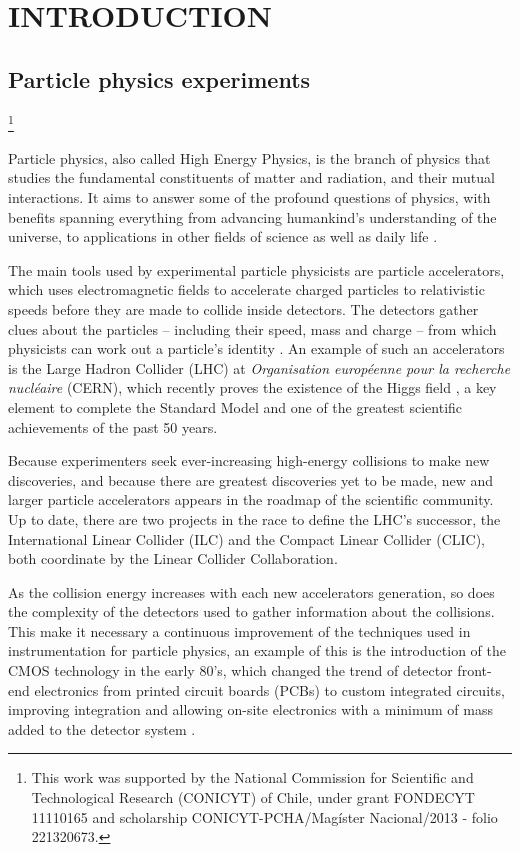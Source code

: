 \newcommand\blfootnote[1]{%
  \begingroup
  \renewcommand\thefootnote{}\footnote{#1}%
  \addtocounter{footnote}{-1}%
  \endgroup
}

\chapter{INTRODUCTION}
\label{chapter:introduction}
\section{Particle physics experiments}
\blfootnote{This work was supported by the National Commission for Scientific and Technological Research (CONICYT) of Chile, under grant FONDECYT 11110165 and scholarship CONICYT-PCHA/Mag\'ister Nacional/2013 - folio 221320673.} Particle physics, also called High Energy Physics, is the branch of physics that studies the fundamental constituents of matter and radiation, and their mutual interactions. It aims to answer some of the profound questions of physics, with benefits spanning everything from advancing humankind’s understanding of the universe, to applications in other fields of science as well as daily life \citep{tuttle101}.

The main tools used by experimental particle physicists are particle accelerators, which uses electromagnetic fields to accelerate charged particles to relativistic speeds before they are made to collide inside detectors. The detectors gather clues about the particles – including their speed, mass and charge – from which physicists can work out a particle's identity \citep{cern101}. An example of such an accelerators is the Large Hadron Collider (LHC) at \emph{Organisation européenne pour la recherche nucléaire} (CERN), which recently proves the existence of the Higgs field \citep{Aad:2012tfa, Chatrchyan:2012ufa}, a key element to complete the Standard Model and one of the greatest scientific achievements of the past 50 years. 

Because experimenters seek ever-increasing high-energy collisions to make new discoveries, and because there are greatest discoveries yet to be made, new and larger particle accelerators appears in the roadmap of the scientific community. Up to date, there are two projects in the race to define the LHC's successor, the International Linear Collider (ILC) and the Compact Linear Collider (CLIC), both coordinate by the Linear Collider Collaboration. 

As the collision energy increases with each new accelerators generation, so does the complexity of the detectors used to gather information about the collisions. This make it necessary a continuous improvement of the techniques used in instrumentation for particle physics, an example of this is the introduction of the CMOS technology in the early 80's, which changed the trend of detector front-end electronics from printed circuit boards (PCBs) to custom integrated circuits, improving integration and allowing on-site electronics with a minimum of mass added to the detector system \citep{abuslemethesis}. 

